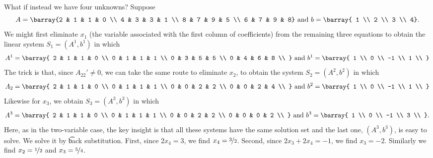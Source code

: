 What if instead we have four unknowns?
Suppose
\[
	A = \barray{2 & 1 & 1 & 0 \\ 4 & 3 & 3 & 1 \\ 8 & 7 & 9 & 5 \\ 6 & 7 & 9 & 8} \text{ and } b = \barray{ 1 \\ 2 \\ 3 \\ 4}.
\]
We might first eliminate $x_1$ (the variable associated with the first column of coefficients) from the remaining three equations to obtain the linear system $S_1 = (A^1, b^1)$ in which
\[
	A^1 = \barray{
	2 & 1 & 1 & 0 \\
	0 & 1 & 1 & 1 \\
	0 & 3 & 5 & 5 \\
	0 & 4 & 6 & 8 \\
	} \text{ and } b^1 = \barray{
		1 \\
		0 \\
		-1 \\
		1 \\
	}
\]
The trick is that, since $A_{22}' \neq 0$, we can take the same route to eliminate $x_2$, to obtain the system $S_2 = (A^2, b^2)$ in which
\[
	A_2 = \barray{
	2 & 1 & 1 & 0 \\
	0 & 1 & 1 & 1 \\
	0 & 0 & 2 & 2 \\
	0 & 0 & 2 & 4 \\
	} \text{ and } b^2 = \barray{
		1 \\
		0 \\
		-1 \\
		1 \\
	}
\]
Likewise for $x_3$, we obtain $S_3 = (A^3, b^3)$ in which
\[
	A^3 = \barray{
	2 & 1 & 1 & 0 \\
	0 & 1 & 1 & 1 \\
	0 & 0 & 2 & 2 \\
	0 & 0 & 0 & 2 \\
	} \text{ and } b^3 = \barray{
		1 \\
		0 \\
		-1 \\
		3 \\
	}.
\]
Here, as in the two-variable case, the key insight is that all these systems have the same solution set and the last one, $(A^3, b^3)$, is easy to solve.
We solve it by \t{back substitution}.
First, since $2x_4 = 3$, we find $x_4 = \nicefrac{3}{2}$.
Second, since $2x_3 + 2x_4 = -1$, we find $x_3 = -2$.
Similarly we find $x_2 = \nicefrac{1}{2}$ and $x_3 = \nicefrac{5}{4}$.


